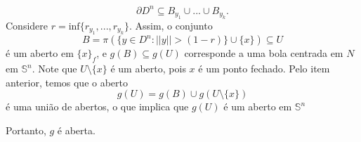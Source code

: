 \begin{dem}
\begin{itemize}
        \[\partial D^n\subseteq B_{y_1}\cup...\cup B_{y_k}.\]
        Considere $r=\text{inf}\{r_{y_1},...,r_{y_k}\}$. Assim, o conjunto 
        \[B=\pi(\{y\in D^n: ||y||>(1-r)\}\cup\{x\})\subseteq U\]
        é um aberto em $\{x\}_f$, e $g(B)\subseteq g(U)$ corresponde a uma bola centrada em $N$ em $\mathbb{S}^n$. Note que $U\setminus \{x\}$ é um aberto, pois $x$ é um ponto fechado. Pelo item anterior, temos que o aberto
        \[g(U)=g(B)\cup g(U\setminus\{x\})\]
        é uma união de abertos, o que implica que $g(U)$ é um aberto em $\mathbb{S}^n$
    \end{itemize} 
    Portanto, $g$ é aberta.
\end{dem}

